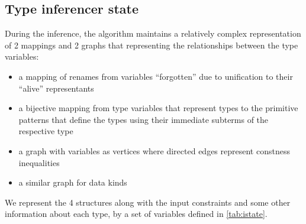 \subsection{Type inferencer state}
\label{sec:istate}

During the inference, the algorithm maintains a relatively complex representation of 2 mappings and 2 graphs that representing the relationships between the type variables:

\begin{itemize}
    \item a mapping of renames from variables ``forgotten'' due to unification to their ``alive'' representants
    \item a bijective mapping from type variables that represent types to the primitive patterns that define the types using their immediate subterms of the respective type
    \item a graph with variables as vertices where directed edges represent constness inequalities
    \item a similar graph for data kinds
\end{itemize}

We represent the 4 structures along with the input constraints and some other information about each type, by a set of variables defined in \cref{tab:istate}.

